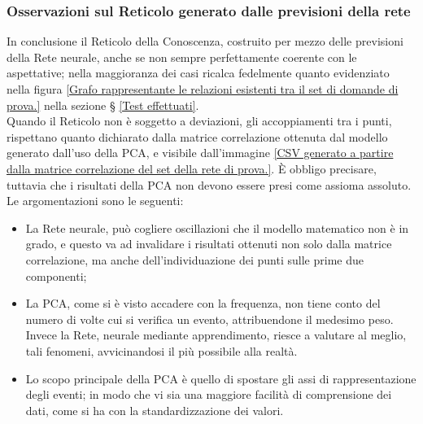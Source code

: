 \subsubsection{Osservazioni sul Reticolo generato dalle previsioni della rete}
\label{Osservazioni generato dalla previsioni della rete}
In conclusione il Reticolo della Conoscenza, costruito per mezzo delle previsioni della Rete neurale, anche se non sempre perfettamente coerente con le aspettative; nella maggioranza dei casi ricalca fedelmente quanto evidenziato nella figura \ref{Grafo rappresentante le relazioni esistenti tra il set di domande di prova.} nella sezione § \ref{Test effettuati}. \\
Quando il Reticolo non \`e soggetto a deviazioni, gli accoppiamenti tra i punti, rispettano quanto dichiarato dalla matrice correlazione ottenuta dal modello generato dall'uso della PCA, e visibile dall'immagine \ref{CSV generato a partire dalla matrice correlazione del set della rete di prova.}.
\`E obbligo precisare, tuttavia che i risultati della PCA non devono essere presi come assioma assoluto. Le argomentazioni sono le seguenti:
\begin{itemize} 
\item La Rete neurale, pu\`o cogliere oscillazioni che il modello matematico non \`e in grado, e questo va ad invalidare i risultati ottenuti non solo dalla matrice correlazione, ma anche dell'individuazione dei punti sulle prime due componenti;
\item La PCA, come si \`e visto accadere con la frequenza, non tiene conto del numero di volte cui si verifica un evento, attribuendone il medesimo peso. Invece la Rete, neurale mediante apprendimento, riesce a valutare al meglio, tali fenomeni, avvicinandosi il pi\`u possibile alla realt\`a.
\item Lo scopo principale della PCA \`e quello di spostare gli assi di rappresentazione degli eventi; in modo che vi sia una maggiore facilit\`a di comprensione dei dati, come si ha con la standardizzazione dei valori.
\end{itemize}

